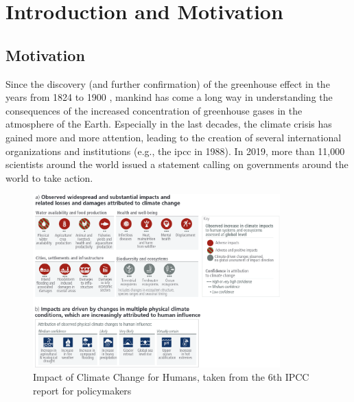 

\chapter{Introduction and Motivation}
\label{ch:intro}


\section{Motivation}
\label{sec:motivation}


Since the discovery (and further confirmation) of the greenhouse effect in the years from 1824 to 1900 \cite{fourier1824remarques, foote1856circumstances}, mankind has come a long way in understanding the consequences of the increased concentration of greenhouse gases in the atmosphere of the Earth. 
Especially in the last decades, the climate crisis has gained more and more attention, leading to the creation of several international organizations and institutions (e.g., the \ac{ipcc} in 1988).
In 2019, more than 11,000 scientists around the world issued a statement \cite{ripple_world_2019} calling on governments around the world to take action.




\begin{figure}[hbt]
  \begin{center}
    \includegraphics[width=0.85\textwidth]{figures/ipcc_6th_report_impacts_climate_change.png}
  \end{center}
  \caption[IPCC 2024 Climate Change Impact]{Impact of Climate Change for Humans, taken from the 6th IPCC report for policymakers \cite{lee2024climate}}
  \label{fig:impacts_climate_change}
\end{figure}



